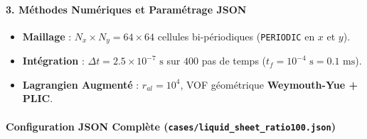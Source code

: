 \documentclass[
  10pt,
]{article}
\providecommand{\tightlist}{%
  \setlength{\itemsep}{0pt}\setlength{\parskip}{0pt}}
\begin{document}
\paragraph{3. Méthodes Numériques et Paramétrage
JSON}\label{muxe9thodes-numuxe9riques-et-paramuxe9trage-json-10}

\begin{itemize}
\tightlist
\item
  \textbf{Maillage} : \(N_x \times N_y = 64 \times 64\) cellules
  bi-périodiques (\texttt{PERIODIC} en \(x\) et \(y\)).
\item
  \textbf{Intégration} : \(\Delta t = 2.5 \times 10^{-7}\text{ s}\) sur
  \(400\) pas de temps (\(t_f = 10^{-4}\text{ s} = 0.1\text{ ms}\)).
\item
  \textbf{Lagrangien Augmenté} : \(r_{al} = 10^4\), VOF géométrique
  \textbf{Weymouth-Yue + PLIC}.
\end{itemize}

\paragraph{\texorpdfstring{Configuration JSON Complète
(\texttt{cases/liquid\_sheet\_ratio100.json})}{Configuration JSON Complète (cases/liquid\_sheet\_ratio100.json)}}\label{configuration-json-compluxe8te-casesliquid_sheet_ratio100.json}
\end{document}
